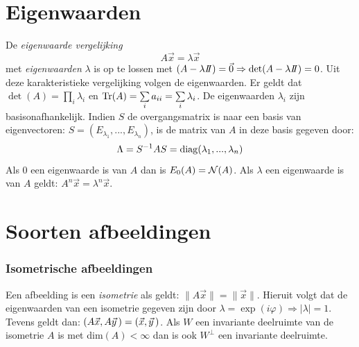 \documentclass[twoside]{report}
\begin{document}
\section{Eigenwaarden}
De {\it eigenwaarde vergelijking}
\[
A\vec{x}=\lambda\vec{x}
\]
met {\it eigenwaarden} $\lambda$ is op te lossen met
$(A-\lambda I\hspace{-1mm}I)=\vec{0}\Rightarrow\det(A-\lambda I\hspace{-1mm}I)=0$. Uit deze
karakteristieke vergelijking volgen de eigenwaarden. Er geldt dat
$\det(A)=\prod\limits_i\lambda_i$ en
${\rm Tr}(A)=\sum\limits_ia_{ii}=\sum\limits_i\lambda_i$.
\npar
De eigenwaarden $\lambda_i$ zijn basisonafhankelijk. Indien $S$ de overgangsmatrix
is naar een basis van eigenvectoren: $S=(E_{\lambda_1},...,E_{\lambda_n})$, is
de matrix van $A$ in deze basis gegeven door:
\[
\Lambda=S^{-1}AS={\rm diag}(\lambda_1,...,\lambda_n)
\]
Als 0 een eigenwaarde is van $A$ dan is $E_0(A)={\cal N}(A)$.
\npar
Als $\lambda$ een eigenwaarde is van $A$ geldt: $A^n\vec{x}=\lambda^n\vec{x}$.

\section{Soorten afbeeldingen}
\subsubsection{Isometrische afbeeldingen}
Een afbeelding is een {\it isometrie} als geldt: $\|A\vec{x}\|=\|\vec{x}\|$.
Hieruit volgt dat de eigenwaarden van een isometrie gegeven zijn door
$\lambda=\exp(i\varphi)\Rightarrow|\lambda|=1$. Tevens geldt dan:
$(A\vec{x},A\vec{y}\,)=(\vec{x},\vec{y}\,)$.
\npar
Als $W$ een invariante deelruimte van de isometrie $A$ is met dim$(A)<\infty$
dan is ook $W^\perp$ een invariante deelruimte.
\end{document}
